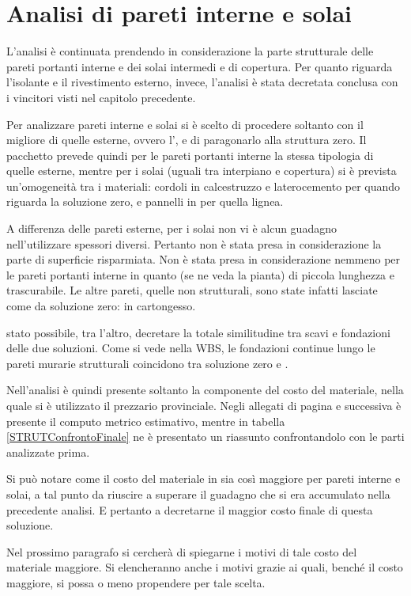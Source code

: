 \chapter{Analisi di pareti interne e solai}
L'analisi è continuata prendendo in considerazione la parte strutturale delle pareti portanti interne e dei solai intermedi e di copertura.
Per quanto riguarda l'isolante e il rivestimento esterno, invece, l'analisi è stata decretata conclusa con i vincitori visti nel capitolo precedente.

Per analizzare pareti interne e solai si è scelto di procedere soltanto con il migliore di quelle esterne, ovvero l'\xlam, e di paragonarlo alla struttura zero.
Il pacchetto prevede quindi per le pareti portanti interne la stessa tipologia di quelle esterne, mentre per i solai (uguali tra interpiano e copertura) si è prevista un'omogeneità tra i materiali: cordoli in calcestruzzo e laterocemento per quando riguarda la soluzione zero, e pannelli in \xlam{} per quella lignea.

A differenza delle pareti esterne, per i solai non vi è alcun guadagno nell'utilizzare spessori diversi. 
Pertanto non è stata presa in considerazione la parte di superficie risparmiata. 
Non è stata presa in considerazione nemmeno per le pareti portanti interne in quanto (se ne veda la pianta) di piccola lunghezza e trascurabile.
Le altre pareti, quelle non strutturali, sono state infatti lasciate come da soluzione zero: in cartongesso.

\e stato possibile, tra l'altro, decretare la totale similitudine tra scavi e fondazioni delle due soluzioni.
Come si vede nella WBS, le fondazioni continue lungo le pareti murarie strutturali coincidono tra soluzione zero e \xlam.

Nell'analisi è quindi presente soltanto la componente del costo del materiale, nella quale si è utilizzato il prezzario provinciale.
Negli allegati di pagina \pageref{STRUTMuraturaTotaleIntESol} e successiva è presente il computo metrico estimativo, mentre in tabella \ref{STRUTConfrontoFinale} ne è presentato un riassunto confrontandolo con le parti analizzate prima.


Si può notare come il costo del materiale in \xlam{} sia così maggiore per pareti interne e solai, a tal punto da riuscire a superare il guadagno che si era accumulato nella precedente analisi.
E pertanto a decretarne il maggior costo finale di questa soluzione.

Nel prossimo paragrafo si cercherà di spiegarne i motivi di tale costo del materiale maggiore.
Si elencheranno anche i motivi grazie ai quali, benché il costo maggiore, si possa o meno propendere per tale scelta.








